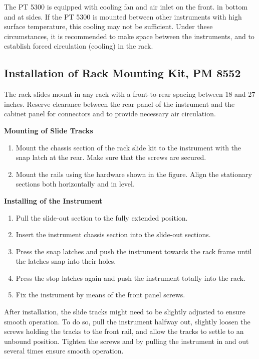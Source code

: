 The PT 5300 is equipped with cooling fan and air inlet on the front. in bottom and at sides.
If the PT 5300 is mounted between other instruments with high surface temperature, this cooling may not be sufficient. Under these circumstances, it is recommended to make space between the instruments, and to establish forced circulation (cooling) in the rack.

\subsection{Installation of Rack Mounting Kit, PM 8552}
The rack slides mount in any rack with a front-to-rear spacing between 18 and 27 inches.
Reserve clearance between the rear panel of the instrument and the cabinet panel for
connectors and to provide necessary air circulation.

\textbf{Mounting of Slide Tracks}
\begin{enumerate}
\item Mount the chassis section of the rack slide kit to the instrument with the snap latch at the rear. Make sure that the screws are secured.
\item Mount the rails using the hardware shown in the figure. Align the stationary sections both horizontally and in level.
\end{enumerate}

\textbf{Installing of the Instrument}
\begin{enumerate}
\item Pull the slide-out section to the fully extended position.
\item Insert the instrument chassis section into the slide-out sections.
\item Press the snap latches and push the instrument towards the rack frame until the latches snap into their holes.
\item Press the stop latches again and push the instrument totally into the rack.
\item Fix the instrument by means of the front panel screws.
\end{enumerate}

After installation, the slide tracks might need to be slightly adjusted to ensure smooth operation.
To do so, pull the instrument halfway out, slightly loosen the screws holding the tracks to the front rail, and allow the tracks to settle to an unbound position. Tighten the screws and by pulling the instrument in and out several times ensure smooth operation.

